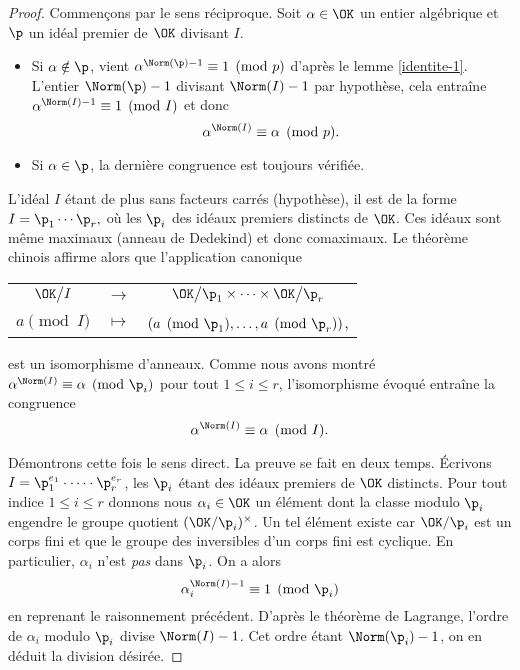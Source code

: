 \begin{proof}
	Commençons par le sens réciproque. Soit $\alpha\in \OK$ un entier algébrique et $\p$ un idéal premier de $\OK$ divisant $I$.
	\begin{itemize}
		\item Si $\alpha \notin \p$, vient $\alpha^{\Norm(\p) - 1} \equiv 1 \pmod{p}$ d'après le lemme \ref{identite-1}. L'entier $\Norm(\p) - 1$ divisant $\Norm(I) - 1$ par hypothèse, cela entraîne $\alpha^{\Norm(I)-1}\equiv 1 \pmod{I}$ et donc \[\alpha^{\Norm(I)} \equiv \alpha \pmod{p}.\]
		\item Si $\alpha\in \p$, la dernière congruence est toujours vérifiée.
	\end{itemize}
	L'idéal $I$ étant de plus sans facteurs carrés (hypothèse), il est de la forme $I = \p_1 \cdots \p_r,$ où les $\p_i$ des idéaux premiers distincts de $\OK$. Ces idéaux sont même maximaux (anneau de Dedekind) et donc comaximaux. Le théorème chinois affirme alors que l'application canonique
\begin{center}
	\begin{tabular}{ccc}
		$\OK \big/I$ & $\longrightarrow$ & $\OK\big/\p_1\times \dots \times \OK\big/ \p_r$ \\
		$a\pmod{I} $	& $\longmapsto$ & $\left(a\pmod{\p_1} , \dots, a\pmod{\p_r}\right)$,
	\end{tabular}
\end{center}
est un isomorphisme d'anneaux. Comme nous avons montré $\alpha^{\Norm(I)} \equiv \alpha \pmod{\p_i}$ pour tout $1\leq i \leq r$, l'isomorphisme évoqué entraîne la congruence \[\alpha^{\Norm(I)} \equiv \alpha \pmod{I}.\]

	Démontrons cette fois le sens direct. La preuve se fait en deux temps. Écrivons $I = \p_1^{e_1} \cdot \dots \cdot \p_r^{e_r}$, les $\p_i$ étant des idéaux premiers de $\OK$ distincts. Pour tout indice $1\leqslant i \leqslant r$ donnons nous $\alpha_i\in \OK$ un élément dont la classe modulo $\p_i$ engendre le groupe quotient $(\OK/\p_i)^\times$. Un tel élément existe car $\OK/\p_i$ est un corps fini et que le groupe des inversibles d'un corps fini est cyclique. En particulier, $\alpha_i$ n'est \emph{pas} dans $\p_i$. On a alors \[\alpha_i^{\Norm(I) - 1} \equiv 1 \pmod{\p_i}\] en reprenant le raisonnement précédent. D'après le théorème de Lagrange, l'ordre de $\alpha_i$ modulo $\p_i$ divise $\Norm(I) - 1$. Cet ordre étant $\Norm(\p_i) - 1$, on en déduit la division désirée. 


\end{proof}
